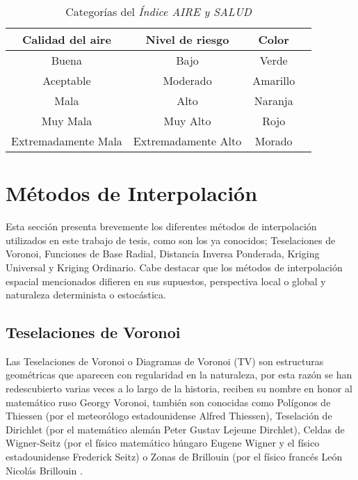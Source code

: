 \begin{table}[H]
\centering
\caption{Categorías del {\em Índice AIRE y SALUD}}
\begin{adjustbox}{max width=0.9\textwidth}
\begin{tabular}{|c|c|c|c|}
\hline
Calidad del aire & Nivel de riesgo  &Color \\ \hline
Buena &Bajo &Verde \\ \hline
Aceptable &Moderado &Amarillo \\ \hline
Mala &Alto &Naranja \\ \hline
Muy Mala &Muy Alto &Rojo \\ \hline
Extremadamente Mala & Extremadamente Alto &Morado \\ \hline
\end{tabular}
\end{adjustbox}
\label{categorias}
\end{table}








\section{Métodos de Interpolación}

Esta sección presenta brevemente los diferentes métodos de interpolación utilizados en este trabajo de tesis, como son los ya conocidos; Teselaciones de Voronoi, Funciones de Base Radial, Distancia Inversa Ponderada, Kriging Universal y Kriging Ordinario. Cabe destacar que los métodos de interpolación espacial mencionados difieren en sus supuestos, perspectiva local o global y naturaleza determinista o estocástica.

\subsection{Teselaciones de Voronoi}
Las Teselaciones de Voronoi o Diagramas de Voronoi (TV) son estructuras geométricas que aparecen con regularidad en la naturaleza, por esta razón se han redescubierto varias veces a lo largo de la historia, reciben su nombre en honor al matemático ruso Georgy Voronoi, también son conocidas como Polígonos de Thiessen (por el meteorólogo estadounidense Alfred Thiessen), Teselación de Dirichlet (por el matemático alemán Peter Gustav Lejeune Dirchlet), Celdas de Wigner-Seitz (por el físico matemático húngaro Eugene Wigner y el físico estadounidense Frederick Seitz) o Zonas de Brillouin (por el físico francés León Nicolás Brillouin \citep{aurenhammer}.

